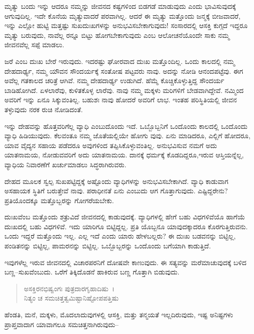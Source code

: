 ಮೃತ್ಯು ಬಂದು ಇನ್ನು ಆದರೂ ನಮ್ಮನ್ನು ಜೀವನದ ಕಷ್ಟಗಳಿಂದ ಬಿಡಗಡೆ ಮಾಡುವುದು ಎಂದು ಭಾವಿಸುವುದಕ್ಕೆ ಆಗುವುದಿಲ್ಲ. ಇದೇ ಕೊನೆಯ ಮೃತ್ಯುವಾದರೆ ಪರವಾಗಿಲ್ಲ. ಆದರೆ ಈ ಮೃತ್ಯು ಮತ್ತೊಂದು ಜನ್ಮಕ್ಕೆ ಬೀಜವಾದರೆ, ಇನ್ನು ಎಲ್ಲೋ ಹುಟ್ಟಿ ಮತ್ತಷ್ಟು ಸುಖದುಃಖಗಳನ್ನು ಅನುಭವಿಸಬೇಕಾಗುವುದು! ಸಂಸಾರದಲ್ಲಿ ಆಸಕ್ತಿ ಕುಗ್ಗದೆ ಇದ್ದರೂ ಮೃತ್ಯು ಬರುವುದು, ನಾವೆಲ್ಲ ರನ್ನೂ ಬಿಟ್ಟು ಹೋಗಬೇಕಾಗುವುದು ಎಂಬ ಆಲೋಚನೆಯೊಂದೇ ಸಾಕು ನಮ್ಮ ಜೀವನವೆಲ್ಲ ಸಪ್ಪೆ ಮಾಡಲು.

ಜರೆ ಎಂಬ ದುಃಖ ಬೇರೆ ಇರುವುದು. ಇದರಷ್ಟು ಘೋರವಾದ ದುಃಖ ಮತ್ತೊಂದಿಲ್ಲ. ಒಂದು ಕಾಲದಲ್ಲಿ ನಮ್ಮ ದೇಹದಾರ್ಢ್ಯ, ನಮ್ಮ ಯೌವನ ಸೌಂದರ್ಯಕ್ಕೆ ಸಂತೋಷ ಪಟ್ಟವರು ನಾವು. ಅದನ್ನು ನೋಡಿ ಆನಂದಪಟ್ಟೆವು. ಈಗ ಅವೆಲ್ಲ ಗತಕಾಲದ ಚರಿತ್ರೆ ಆಗಿವೆ. ನಮ್ಮ ದೇಹದಾರ್ಢ್ಯ ಉಡುಗಿದೆ. ಹೆಮ್ಮೆ ಕೊಚ್ಚಿಕೊಳ್ಳುತ್ತಿದ್ದ ಸೌಂದರ್ಯ ಬಾಡಿಹೋಗಿದೆ. ಏಳಲಾರೆವು, ಕುಳಿತಕೊಳ್ಳ ಲಾರೆವು. ನಾವು ನಮ್ಮ ಮಕ್ಕಳು ಮರಿಗಳಿಗೆ ಬೇಡವಾಗಿದ್ದೇವೆ. ನಮ್ಮಿಂದ ಅವರಿಗೆ ಇನ್ನು ಏನೂ ಸಿಕ್ಕುವಂತಿಲ್ಲ. ಬಹುಶಃ ನಾವು ಹೋದರೆ ಅವರಿಗೆ ಲಾಭ. ಇಂತಹ ಪರಿಸ್ಥಿತಿಯಲ್ಲಿ ಜೀವನ ತಳ್ಳುವುದು ನರಕ ರುಚಿ ನೋಡಿದಂತೆ.

ಇನ್ನು ದೇಹವನ್ನು ಹೊತ್ತವರಿಗೆಲ್ಲ ವ್ಯಾಧಿ ಎಂಬುದೊಂದು ಇದೆ. ಒಬ್ಬೊಬ್ಬನಿಗೆ ಒಂದೊಂದು ಕಾಲದಲ್ಲಿ ಒಂದೊಂದು ವ್ಯಾಧಿ ಹಿಡಿಯುವುದು. ಕೆಲವಂತೂ ನಮ್ಮ ಜೊತೆಯಲ್ಲಿಯೇ ಹೋಗು ವುವು. ಏನು ಮಾಡಿದರೂ, ಎಲ್ಲಿಗೆ ಹೋದರೂ, ಯಾವ ವೈದ್ಯನ ಸಹಾಯ ಪಡೆದರೂ ಅವುಗಳಿಂದ ತಪ್ಪಿಸಿಕೊಳ್ಳುವಂತಿಲ್ಲ. ಅನುಭವಿಸುವ ನಮಗೆ ಅದು ಯಾತನಾಮಯ, ನೋಡುವವರಿಗೆ ಅದು ಯಾತನಾಮಯ. ದಾನಕ್ಕೆ ಧರ್ಮಕ್ಕೆ ಕೊಡದಿದ್ದರೂ,ಇರುವ ಆಸ್ತಿಯನ್ನೆಲ್ಲ, ವ್ಯಾಧಿಯ ನಿವಾರಣೆಗೆ ಖರ್ಚುಮಾಡಲು ಸಿದ್ಧರಾಗಿರುವರು.

ದೇಹದ ಮೂಲಕ ಸ್ವಲ್ಪ ಸುಖಪಟ್ಟಿದ್ದಕ್ಕೆ ಅಷ್ಟೊಂದು ವ್ಯಾಧಿಗಳನ್ನು ಅನುಭವಿಸಬೇಕಾಗಿದೆ. ವ್ಯಾಧಿ ಕಾಡುವಾಗ ಅಸಹಾಯಕ ಸ್ಥಿತಿಗೆ ಬರುತ್ತೇವೆ ನಾವು. ಪರಾಧೀನತೆ ಏನು ಎಂಬುದು ಆಗ ಗೊತ್ತಾಗುವುದು. ಎಷ್ಟಿದ್ದರೇನು? ಪ್ರತಿಯೊಂದಕ್ಕೂ ಮತ್ತೊಬ್ಬರನ್ನು ಗೋಗರೆಯಬೇಕು.

ದುಃಖವೆಂಬ ಮತ್ತೊಂದು ಶತ್ರುವಿದೆ ಜೀವನದಲ್ಲಿ ಕಾಡುವುದಕ್ಕೆ. ವ್ಯಾಧಿಗಳಲ್ಲಿ ಹೇಗೆ ಬಹು ವಿಧಗಳಿವೆಯೊ ಹಾಗೆಯೆ ದುಃಖದಲ್ಲಿ ಬಹು ವಿಧಗಳಿವೆ. ಇದು ಯಾರಿಗೂ ಬಿಟ್ಟಿದ್ದಲ್ಲ. ಪ್ರತಿ ಯೊಬ್ಬನೂ ಯಾವುದಕ್ಕಾದರೂ ಕೊರಗುತ್ತಿರುವನು. ಒಂದು ಇದ್ದರೆ ಮತ್ತೊಂದು ಇಲ್ಲ. ಎಲ್ಲ ಇದೆ ಎಂದು ಯಾರು ಹೇಳಬಲ್ಲರು? ಈ ದುಃಖ ಬಡವನನ್ನು ಬಿಟ್ಟಿಲ್ಲ, ಪಂಡಿತನನ್ನು ಬಿಟ್ಟಿಲ್ಲ, ಪಾಮರನನ್ನು ಬಿಟ್ಟಿಲ್ಲ. ಒಬ್ಬೊಬ್ಬರನ್ನು ಒಂದೊಂದು ಬಗೆಯಾಗಿ ಕಾಡುತ್ತಿದೆ.

ಇವುಗಳೆಲ್ಲ ಇರುವ ಜೀವನದಲ್ಲಿ ವಿಚಾರಪರನಿಗೆ ದೋಷವೇ ಕಾಣುವುದು. ಈ ಸತ್ಯವನ್ನು ಮರೆಮಾಚುವುದಕ್ಕೆ ಬಳಿದ ಬಣ್ಣ–ಸುಖವೆಂಬುದು. ಒರೆಗೆ ತಿಕ್ಕಿದೊಡನೆ ಹಾಕಿರುವ ಬಣ್ಣ ಗೊತ್ತಾಗಿ ಬಿಡುವುದು.

\begin{verse}
ಅಸಕ್ತಿರನಭಿಷ್ವಂಗಃ ಪುತ್ರದಾರಗೃಹಾದಿಷು~।\\ನಿತ್ಯಂ ಚ ಸಮಚಿತ್ತತ್ವಮಿಷ್ಟಾನಿಷ್ಟೋಪಪತ್ತಿಷು 
\end{verse}

{\small ಹೆಂಡತಿ, ಮನೆ, ಮಕ್ಕಳು, ಮೊದಲಾದುವುಗಳಲ್ಲಿ ಆಸಕ್ತಿ, ಮತ್ತು ತನ್ಮಯತೆ ಇಲ್ಲದಿರುವುದು, ಇಷ್ಟ ಅನಿಷ್ಟಗಳು ಪ್ರಾಪ್ತವಾದಾಗ ಯಾವಾಗಲೂ ಸಮಚಿತ್ತನಾಗಿರುವುದು–}

